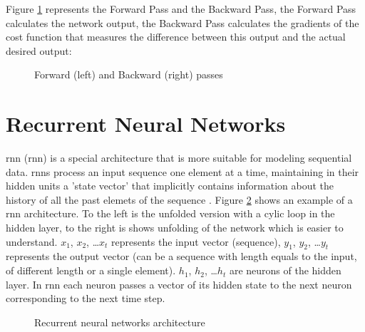 Figure \ref{fig:forward-backward-pass} represents the Forward Pass and the Backward Pass, the Forward Pass calculates the network output, the Backward Pass calculates the gradients of the cost function that measures the difference between this output and the actual desired output:

\begin{figure}[h]
    \centering
	
    \caption{Forward (left) and Backward (right) passes}
    \label{fig:forward-backward-pass}
\end{figure}

\section{Recurrent Neural Networks}
\acrlong{rnn} (\acrshort{rnn}) is a special architecture that is more suitable for modeling sequential data. \acrshort{rnn}s process an input sequence one element at a time, maintaining in their hidden units a 'state vector' that implicitly contains information about the history of all the past elemets of the sequence \cite{LeCun2015}. Figure \ref{fig:rnn} shows an example of a \acrshort{rnn} architecture. To the left is the unfolded version with a cylic loop in the hidden layer, to the right is shows unfolding of the network which is easier to understand. $x_1$, $x_2$, …$x_t$ represents the input vector (sequence), $y_1$, $y_2$, …$y_t$ represents the output vector (can be a sequence with length equals to the input, of different length or a single element). $h_1$, $h_2$, …$h_t$ are neurons of the hidden layer. In \acrshort{rnn} each neuron passes a vector of its hidden state to the next neuron corresponding to the next time step.
    
\begin{figure}[H]
        \centering
        
        \caption{Recurrent neural networks architecture}
        \label{fig:rnn}
\end{figure}

